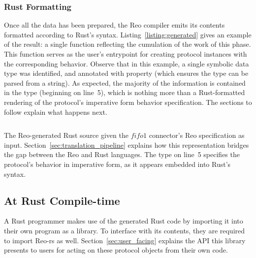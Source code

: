 \subsubsection{Rust Formatting}
Once all the data has been prepared, the Reo compiler emits its contents formatted according to Rust's syntax. Listing~\ref{listing:generated} gives an example of the result: a single  function reflecting the cumulation of the work of this phase. This function serves as the user's entrypoint for creating protocol instances with the corresponding behavior.
Observe that in this example, a single symbolic data type  was identified, and annotated with property  (which ensures the type can be parsed from a string). As expected, the majority of the information is contained in the  type (beginning on line~5), which is nothing more than a Rust-formatted rendering of the protocol's imperative form behavior specification. The sections to follow explain what happens next.

\begin{listing}[ht]
	\centering
	\inputminted[]{rust}{generated.rs}
	\caption[TODO.]{The Reo-generated Rust source given the $fifo1$ connector's Reo specification as input. Section~\ref{sec:translation_pipeline} explains how this representation bridges the gap between the Reo and Rust languages. The  type on line~5 specifies the protocol's behavior in imperative form, as it appears embedded into Rust's syntax.}
	\label{listing:generated}
\end{listing}

\subsection{At Rust Compile-time}
A Rust programmer makes use of the generated Rust code by importing it into their own program as a library. To interface with its contents, they are required to import Reo-rs as well. Section~\ref{sec:user_facing} explains the API this library presents to users for acting on these protocol objects from their own code. 

